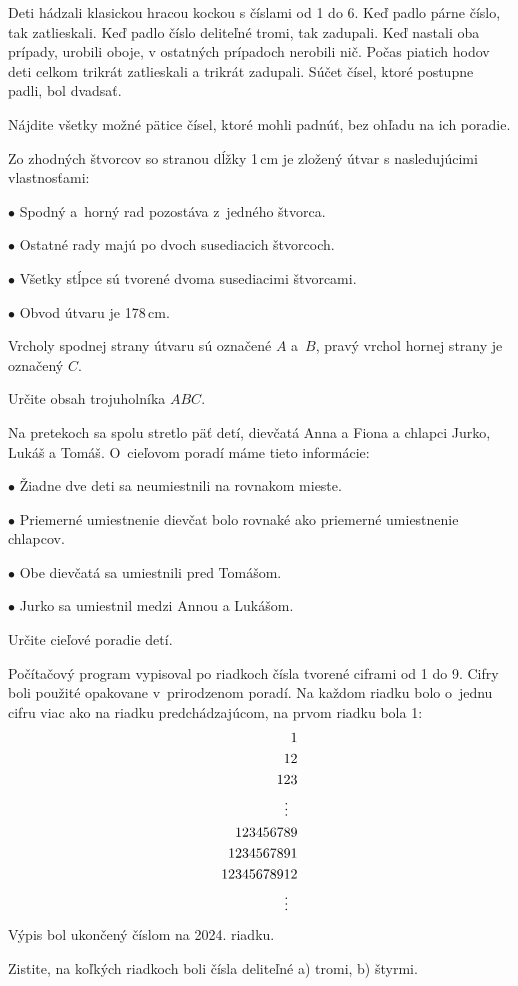 {%
Deti hádzali klasickou hracou kockou s číslami od 1 do 6.
Keď padlo párne číslo, tak zatlieskali.
Keď padlo číslo deliteľné tromi, tak zadupali.
Keď nastali oba prípady, urobili oboje, v ostatných prípadoch nerobili nič.
Počas piatich hodov deti celkom trikrát zatlieskali a trikrát zadupali.
Súčet čísel, ktoré postupne padli, bol dvadsať.

Nájdite všetky možné pätice čísel, ktoré mohli padnúť, bez ohľadu na ich poradie.}

{%
Zo zhodných štvorcov so stranou dĺžky 1\,cm je zložený útvar s nasledujúcimi vlastnosťami:

\smallskip
\item{$\bullet$} Spodný a~horný rad pozostáva z~jedného štvorca.
\item{$\bullet$} Ostatné rady majú po dvoch susediacich štvorcoch.
\item{$\bullet$} Všetky stĺpce sú tvorené dvoma susediacimi štvorcami.
\item{$\bullet$} Obvod útvaru je 178\,cm.

\smallskip\noindent
Vrcholy spodnej strany útvaru sú označené $A$ a~$B$, pravý vrchol hornej strany je označený $C$.

Určite obsah trojuholníka $ABC$.
%
}

{%
Na pretekoch sa spolu stretlo päť detí, dievčatá Anna a Fiona a chlapci Jurko, Lukáš a Tomáš.
O~cieľovom poradí máme tieto informácie:

\smallskip
\item{$\bullet$} Žiadne dve deti sa neumiestnili na rovnakom mieste.
\item{$\bullet$} Priemerné umiestnenie dievčat bolo rovnaké ako priemerné umiestnenie chlapcov.
\item{$\bullet$} Obe dievčatá sa umiestnili pred Tomášom.
\item{$\bullet$} Jurko sa umiestnil medzi Annou a Lukášom.

\smallskip\noindent
Určite cieľové poradie detí.}

{%
Počítačový program vypisoval po riadkoch čísla tvorené ciframi od 1 do 9.
Cifry boli použité opakovane v~prirodzenom poradí.
Na každom riadku bolo o~jednu cifru viac ako na riadku predchádzajúcom, na prvom riadku bola 1:
$$
\aligned
1 \\
12 \\
123 \\
\vdots\ \ \\
123456789 \\
1234567891 \\
12345678912 \\
\vdots\ \
\endaligned
$$
Výpis bol ukončený číslom na 2024. riadku.

Zistite, na koľkých riadkoch boli čísla deliteľné
a) tromi,
b) štyrmi.}

